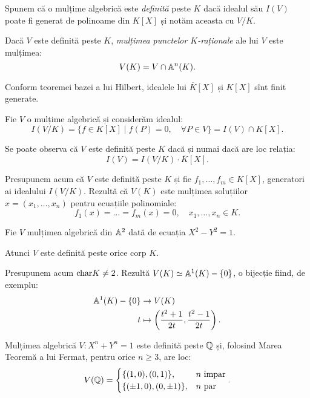 Spunem că o mulțime algebrică este \emph{definită} peste $ K $ dacă idealul său
$ I(V) $ poate fi generat de polinoame din $ K[X] $ și notăm aceasta cu $ V/K $.

Dacă $ V $ este definită peste $ K $, \emph{mulțimea punctelor $ K $-raționale} ale
lui $ V $ este mulțimea:
\[
  V(K) = V \cap \mathbb{A}^n(K).
\]

\begin{remark}\label{rk:kx-finit-gen}
  Conform teoremei bazei a lui Hilbert, idealele lui $ \overline{K}[X] $ și
  $ K[X] $ sînt finit generate.
\end{remark}

Fie $ V $ o mulțime algebrică și considerăm idealul:
\[
  I(V/K) = \{ f \in K[X] \mid f(P) = 0, \quad \forall P \in V \} = I(V) \cap K[X].
\]

Se poate observa că $ V $ este definită peste $ K $ dacă și numai dacă are loc
relația:
\[
  I(V) = I(V/K) \cdot \overline{K}[X].
\]

Presupunem acum că $ V $ este definită peste $ K $ și fie $ f_1, \dots, f_m \in K[X] $,
generatori ai idealului $ I(V/K) $. Rezultă că $ V(K) $ este mulțimea soluțiilor
$ x = (x_1, \dots, x_n) $ pentru ecuațiile polinomiale:
\[
  f_1(x) = \dots = f_m(x) = 0, \quad x_1, \dots, x_n \in K.
\]

\begin{example}\label{exm:multime-alg1}
  Fie $ V $ mulțimea algebrică din $ \mathbb{A}^2 $ dată de ecuația $ X^2 - Y^2 = 1 $.

  Atunci $ V $ este definită peste orice corp $ K $.

  Presupunem acum $ \mathrm{char}K \neq 2 $. Rezultă $ V(K) \simeq \mathbb{A}^1(K) - \{ 0 \} $,
  o bijecție fiind, de exemplu:
  \begin{align*}
    \mathbb{A}^1(K) - \{ 0 \} &\to V(K) \\
    t &\mapsto \left( \dfrac{t^2 + 1}{2t}, \dfrac{t^2 - 1}{2t} \right).
  \end{align*}
\end{example}

\begin{example}\label{exm:multime-alg2}
  Mulțimea algebrică $ V : X^n + Y^n = 1 $ este definită peste $ \mathbb{Q} $ și,
  folosind Marea Teoremă a lui Fermat, pentru orice $ n \geq 3 $, are loc:
  \[
    V(\QQ) = %
    \begin{cases}
      \{(1, 0), (0, 1) \}, & n \text{ impar} \\
      \{(\pm 1, 0), (0, \pm 1)\}, & n \text{ par}
    \end{cases}.
  \]
\end{example}

